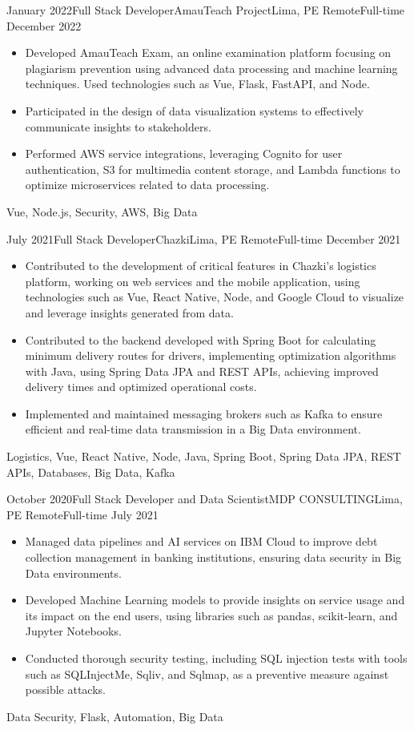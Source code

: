 \begin{experiences}
\emptySeparator
\experience
  {January 2022}{Full Stack Developer}{AmauTeach Project}{Lima, PE}
  {Remote}{Full-time}
  {December 2022} {
    \begin{itemize}
      \item Developed AmauTeach Exam, an online examination platform focusing on plagiarism prevention using advanced data processing and machine learning techniques. Used technologies such as Vue, Flask, FastAPI, and Node.
      \item Participated in the design of data visualization systems to effectively communicate insights to stakeholders.
      \item Performed AWS service integrations, leveraging Cognito for user authentication, S3 for multimedia content storage, and Lambda functions to optimize microservices related to data processing.
    \end{itemize}
  }
  {Vue, Node.js, Security, AWS, Big Data}

\emptySeparator
\experience
  {July 2021}{Full Stack Developer}{Chazki}{Lima, PE}
  {Remote}{Full-time}
  {December 2021} {
    \begin{itemize}
      \item Contributed to the development of critical features in Chazki's logistics platform, working on web services and the mobile application, using technologies such as Vue, React Native, Node, and Google Cloud to visualize and leverage insights generated from data.
      \item Contributed to the backend developed with Spring Boot for calculating minimum delivery routes for drivers, implementing optimization algorithms with Java, using Spring Data JPA and REST APIs, achieving improved delivery times and optimized operational costs.
      \item Implemented and maintained messaging brokers such as Kafka to ensure efficient and real-time data transmission in a Big Data environment.
    \end{itemize}
  }
  {Logistics, Vue, React Native, Node, Java, Spring Boot, Spring Data JPA, REST APIs, Databases, Big Data, Kafka}

\emptySeparator
\experience
  {October 2020}{Full Stack Developer and Data Scientist}{MDP CONSULTING}{Lima, PE}
  {Remote}{Full-time}
  {July 2021} {
    \begin{itemize}
      \item Managed data pipelines and AI services on IBM Cloud to improve debt collection management in banking institutions, ensuring data security in Big Data environments.
      \item Developed Machine Learning models to provide insights on service usage and its impact on the end users, using libraries such as pandas, scikit-learn, and Jupyter Notebooks.
      \item Conducted thorough security testing, including SQL injection tests with tools such as SQLInjectMe, Sqliv, and Sqlmap, as a preventive measure against possible attacks.
    \end{itemize}
  }
  {Data Security, Flask, Automation, Big Data}
\end{experiences}

